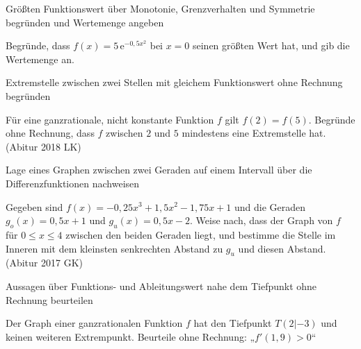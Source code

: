 \begin{aufgabe}{Größten Funktionswert über Monotonie, Grenzverhalten und Symmetrie begründen und Wertemenge angeben}
\begin{teile}
\teil Begründe, dass $f(x) = 5\,\mathrm{e}^{-0{,}5x^2}$ bei $x = 0$ seinen größten Wert hat, und gib die Wertemenge an.
\end{teile}
\end{aufgabe}

\begin{aufgabe}{Extremstelle zwischen zwei Stellen mit gleichem Funktionswert ohne Rechnung begründen}
\begin{teile}
\teil Für eine ganzrationale, nicht konstante Funktion $f$ gilt $f(2) = f(5)$. Begründe ohne Rechnung, dass $f$ zwischen $2$ und $5$ mindestens eine Extremstelle hat. \hfill (Abitur 2018 LK)
\end{teile}
\end{aufgabe}

\begin{aufgabe}{Lage eines Graphen zwischen zwei Geraden auf einem Intervall über die Differenzfunktionen nachweisen}
\begin{teile}
\teil Gegeben sind $f(x) = -0{,}25x^3 + 1{,}5x^2 - 1{,}75x + 1$ und die Geraden $g_o(x) = 0{,}5x + 1$ und $g_u(x) = 0{,}5x - 2$. Weise nach, dass der Graph von $f$ für $0 \le x \le 4$ zwischen den beiden Geraden liegt, und bestimme die Stelle im Inneren mit dem kleinsten senkrechten Abstand zu $g_u$ und diesen Abstand. \hfill (Abitur 2017 GK)
\end{teile}
\end{aufgabe}

\begin{aufgabe}{Aussagen über Funktions- und Ableitungswert nahe dem Tiefpunkt ohne Rechnung beurteilen}
\begin{teile}
\teil Der Graph einer ganzrationalen Funktion $f$ hat den Tiefpunkt $T(2 | -3)$ und keinen weiteren Extrempunkt. Beurteile ohne Rechnung: „$f'(1{,}9) > 0$“ \\  \\ 
\end{teile}
\end{aufgabe}

